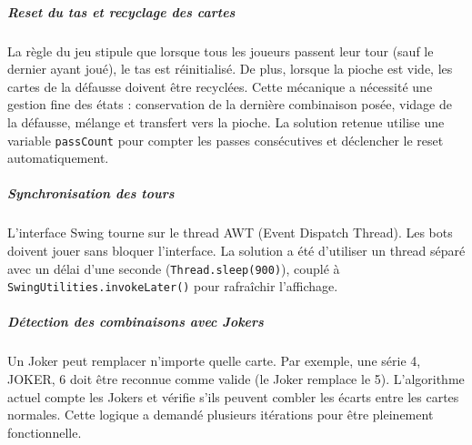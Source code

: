 \subparagraph*{Reset du tas et recyclage des cartes}
La règle du jeu stipule que lorsque tous les joueurs passent leur tour (sauf le dernier ayant joué), le tas est réinitialisé. De plus, lorsque la pioche est vide, les cartes de la défausse doivent être recyclées. Cette mécanique a nécessité une gestion fine des états : conservation de la dernière combinaison posée, vidage de la défausse, mélange et transfert vers la pioche. La solution retenue utilise une variable \texttt{passCount} pour compter les passes consécutives et déclencher le reset automatiquement.

\subparagraph*{Synchronisation des tours}
L'interface Swing tourne sur le thread AWT (Event Dispatch Thread). Les bots doivent jouer sans bloquer l'interface. La solution a été d'utiliser un thread séparé avec un délai d'une seconde (\texttt{Thread.sleep(900)}), couplé à \texttt{SwingUtilities.invokeLater()} pour rafraîchir l'affichage.

\subparagraph*{Détection des combinaisons avec Jokers}
Un Joker peut remplacer n'importe quelle carte. Par exemple, une série {4, JOKER, 6} doit être reconnue comme valide (le Joker remplace le 5). L'algorithme actuel compte les Jokers et vérifie s'ils peuvent combler les écarts entre les cartes normales. Cette logique a demandé plusieurs itérations pour être pleinement fonctionnelle.
